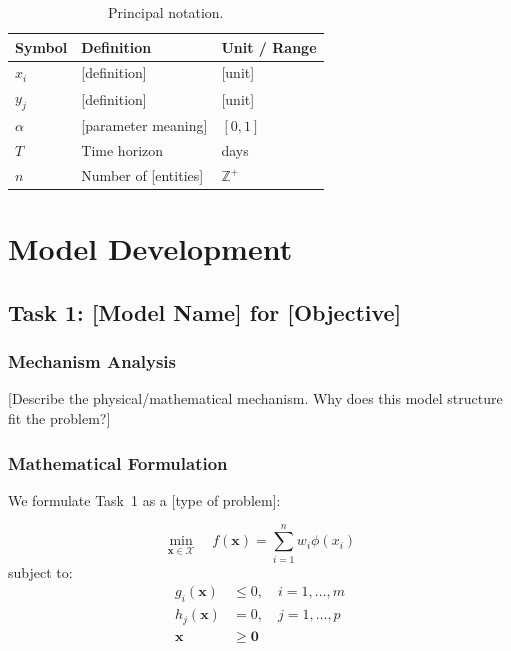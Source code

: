 \documentclass{mcmthesis}
\newcommand{\vect}[1]{\boldsymbol{#1}}
\begin{document}
\begin{table}[H]
\centering
\caption{Principal notation.}
\label{tab:notation}
\begin{tabular}{p{2.2cm} p{7cm} p{2.5cm}}
\toprule
\textbf{Symbol} & \textbf{Definition} & \textbf{Unit / Range} \\
\midrule
$x_i$       & [definition]          & [unit] \\
$y_j$       & [definition]          & [unit] \\
$\alpha$    & [parameter meaning]   & $[0, 1]$ \\
$T$         & Time horizon          & days \\
$n$         & Number of [entities]  & $\mathbb{Z}^+$ \\
\bottomrule
\end{tabular}
\end{table}

\section{Model Development}

\subsection{Task 1: [Model Name] for [Objective]}

\subsubsection{Mechanism Analysis}

[Describe the physical/mathematical mechanism. Why does this model structure fit the problem?]

\subsubsection{Mathematical Formulation}

We formulate Task~1 as a [type of problem]:

\begin{equation}
    \min_{\vect{x} \in \mathcal{X}} \quad f(\vect{x}) = \sum_{i=1}^{n} w_i \phi(x_i)
    \label{eq:obj_task1}
\end{equation}
subject to:
\begin{align}
    g_i(\vect{x}) &\leq 0, \quad i = 1, \ldots, m   \label{eq:ineq} \\
    h_j(\vect{x}) &=    0, \quad j = 1, \ldots, p   \label{eq:eq}   \\
    \vect{x}      &\geq \vect{0}                     \label{eq:nn}
\end{align}
\end{document}
